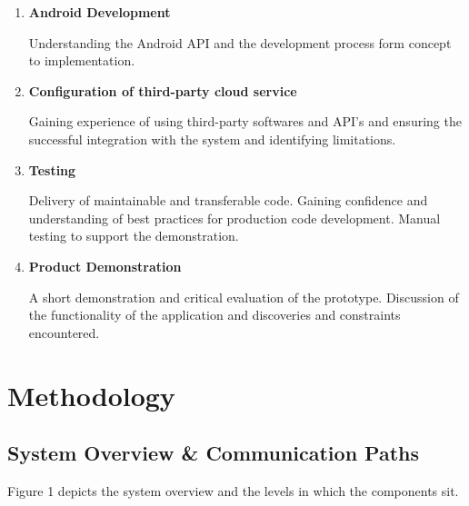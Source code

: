 \documentclass[a4paper, 11pt]{article}
\begin{document}
{\begin{enumerate}
   \item \textbf{Android Development}
   	\begin{flushleft}Understanding the Android API and the development process form concept to implementation. 
  	\end{flushleft}
  
   \item \textbf{Configuration of third-party cloud service}
   	\begin{flushleft}
	Gaining experience of using third-party softwares and API's and ensuring the successful integration with the system and identifying limitations.
 	\end{flushleft}
 
  \item \textbf{Testing}
   	\begin{flushleft}Delivery of maintainable and transferable code. Gaining confidence and understanding of best practices for production code development. Manual testing to support the demonstration. 
 	\end{flushleft}
 
 \item \textbf{Product Demonstration}
 	\begin{flushleft}A short demonstration and critical evaluation of the prototype. Discussion of the functionality of the application and discoveries and constraints encountered.
 	\end{flushleft}
\end{enumerate}
\clearpage


\section{Methodology}

\subsection{System Overview \& Communication Paths}
Figure 1 depicts the system overview and the levels in which the components sit. 

}
\end{document}
